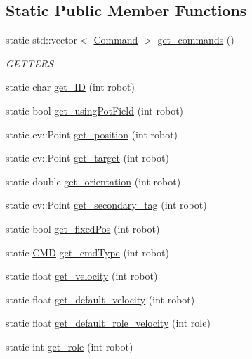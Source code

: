\subsection*{Static Public Member Functions}
\begin{DoxyCompactItemize}
\item 
static std\+::vector$<$ \hyperlink{struct_robots_1_1_command}{Command} $>$ \hyperlink{class_robots_a34e3959011295509ab032e3d96b3cd61}{get\+\_\+commands} ()
\begin{DoxyCompactList}\small\item\em G\+E\+T\+T\+E\+RS. \end{DoxyCompactList}\item 
static char \hyperlink{class_robots_a306bb88b37b41cff35018d51d8228d65}{get\+\_\+\+ID} (int robot)
\item 
static bool \hyperlink{class_robots_a42f3e3d3b1d8c41ad6180a03427458bf}{get\+\_\+using\+Pot\+Field} (int robot)
\item 
static cv\+::\+Point \hyperlink{class_robots_a1fca8f2f5070176faa6ba1efa2f1ff14}{get\+\_\+position} (int robot)
\item 
static cv\+::\+Point \hyperlink{class_robots_a8a4fe339df4823e45cf34d9fb8daa64b}{get\+\_\+target} (int robot)
\item 
static double \hyperlink{class_robots_ae1d0829c1089322c8fac5830f65b13a0}{get\+\_\+orientation} (int robot)
\item 
static cv\+::\+Point \hyperlink{class_robots_a2ebc2bd5efa2313e9f39d676fa70f86a}{get\+\_\+secondary\+\_\+tag} (int robot)
\item 
static bool \hyperlink{class_robots_af1b330514c96d1cac03a895007b8b54e}{get\+\_\+fixed\+Pos} (int robot)
\item 
static \hyperlink{class_robots_adcc7ae7fbb9bdc57a26ee70fa1ae88e5}{C\+MD} \hyperlink{class_robots_abc1028ef8481db1426eb5a093c554ac9}{get\+\_\+cmd\+Type} (int robot)
\item 
static float \hyperlink{class_robots_ac2b2d9709dd5d86723d9dc00dddaabaf}{get\+\_\+velocity} (int robot)
\item 
static float \hyperlink{class_robots_a3b226dd339a3b7a41c120f7d6a1bc515}{get\+\_\+default\+\_\+velocity} (int robot)
\item 
static float \hyperlink{class_robots_a4778a7c755c5cca4b5d1e2c3b46fb314}{get\+\_\+default\+\_\+role\+\_\+velocity} (int role)
\item 
static int \hyperlink{class_robots_ac5cdd16502bd325581fb2d732169a326}{get\+\_\+role} (int robot)

\end{DoxyCompactItemize}
